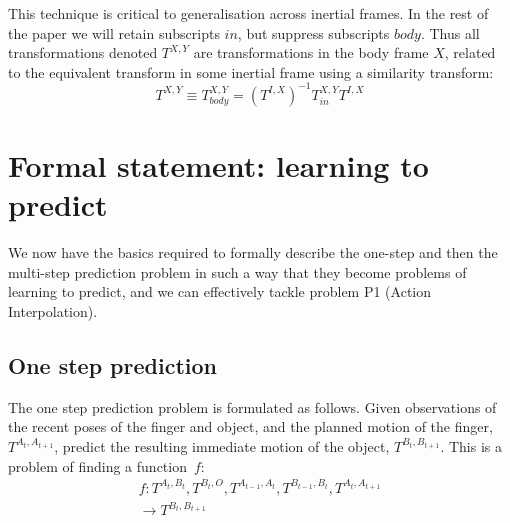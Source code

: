 %
This technique is critical to generalisation across inertial frames. In the rest of the paper we will retain subscripts $in$, but suppress subscripts $body$. Thus all transformations denoted $T^{X, Y}$ are transformations in the body frame $X$, related to the equivalent transform in some inertial frame using a similarity transform:
\begin{equation}
T^{X, Y} \equiv T_{body}^{X, Y} = ({T^{I, X}})^{-1} T_{in}^{X, Y} {T^{I, X}}
\label{eq:Learning.Similarity}
\end{equation}

\section{Formal statement: learning to predict}
\label{sec:PredictionProblem}

We now have the basics required to formally describe the one-step and then the multi-step prediction
problem in such a way that they become problems of learning to predict, and we can effectively tackle problem P1 (Action Interpolation).

\subsection{One step prediction} The one step prediction problem is formulated as follows. Given observations of the recent poses of the finger and object, and the planned motion of the finger, $T^{A_{t},  A_{t+1}}$, predict the resulting immediate motion of the object,
$T^{B_{t}, B_{t+1}}$.  This is a problem of finding a function~$f$:
\begin{multline}
f:T^{A_t, B_t}, T^{B_t, O}, T^{A_{t-1}, A_{t}}, T^{B_{t-1}, B_{t}}, T^{A_{t}, A_{t+1}} \\ \longrightarrow T^{B_{t}, B_{t+1}}
\label{eq:Learning.long}
\end{multline}

